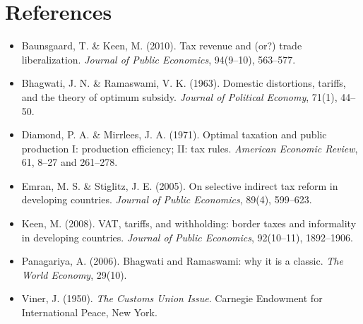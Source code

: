 \documentclass[11pt, a4paper]{article}
\begin{document}
\section*{References}
\small
\begin{itemize}[leftmargin=1.2em, itemsep=2pt, label={}]
\item Baunsgaard, T. \& Keen, M. (2010). Tax revenue and (or?) trade liberalization.
\textit{Journal of Public Economics}, 94(9--10), 563--577.
\item Bhagwati, J. N. \& Ramaswami, V. K. (1963). Domestic distortions, tariffs, and
the theory of optimum subsidy. \textit{Journal of Political Economy}, 71(1), 44--50.
\item Diamond, P. A. \& Mirrlees, J. A. (1971). Optimal taxation and public
production I: production efficiency; II: tax rules. \textit{American Economic
Review}, 61, 8--27 and 261--278.
\item Emran, M. S. \& Stiglitz, J. E. (2005). On selective indirect tax reform in
developing countries. \textit{Journal of Public Economics}, 89(4), 599--623.
\item Keen, M. (2008). VAT, tariffs, and withholding: border taxes and informality in
developing countries. \textit{Journal of Public Economics}, 92(10--11), 1892--1906.
\item Panagariya, A. (2006). Bhagwati and Ramaswami: why it is a classic.
\textit{The World Economy}, 29(10).
\item Viner, J. (1950). \textit{The Customs Union Issue}. Carnegie Endowment for
International Peace, New York.
\end{itemize}
\end{document}

